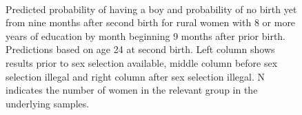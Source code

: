 \documentclass[12pt,letterpaper]{article}
\begin{document}
\begin{figure}[htpb]
{\begin{minipage}{0.31\textwidth}
        \captionsetup[subfigure]{labelformat=empty,position=top,captionskip=-1pt,farskip=-0.5pt}
        \\
        \captionsetup[subfigure]{labelformat=parens}
    \end{minipage}
}
\setcounter{subfigure}{3}
\caption{Predicted probability of having a boy and probability of
no birth yet from nine months after second birth for rural
women with 8 or more years of education by month beginning 9 months after prior birth. 
Predictions based on age 24 at second birth.
Left column shows results prior to sex selection available, middle column before
sex selection illegal and right column after sex selection illegal.
N indicates the number of women in the relevant group in the underlying samples.
}
\label{fig:results_spell4_high_rural}
\end{figure}
\end{document}
